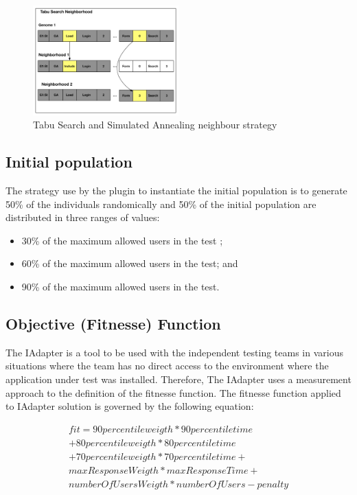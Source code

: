 \begin{figure}[h]
\includegraphics[width=0.5\textwidth]{./images/TabuNE.png}
\caption{Tabu Search and Simulated Annealing neighbour strategy}
\label{fig:neighbourtaby}
\end{figure}


\subsection{Initial population}

The strategy use by the plugin to instantiate the initial population is to generate 50\% of the individuals randomically and 50\% of the initial population are distributed in three  ranges of values:

\begin{itemize}
\item 30\% of the maximum allowed users in the test ;
\item 60\% of the maximum allowed users in the test; and
\item 90\% of the maximum allowed users in the test.
\end{itemize}


\subsection{Objective (Fitnesse) Function}

The IAdapter is a tool to be used with the independent testing teams in various situations where the team has no direct access to the environment where the application under test was installed. Therefore,  The IAdapter uses a measurement approach to the definition of the fitnesse function. The fitnesse function applied to IAdapter solution is governed by the following equation:

\begin{equation}
\begin{aligned}
fit=90percentileweigth* 90percentiletime\\
+80percentileweigth*80percentiletime\\+
70percentileweigth*70percentiletime+\\
maxResponseWeigth*maxResponseTime+\\
numberOfUsersWeigth*numberOfUsers-penalty
\end{aligned}
\end{equation}

